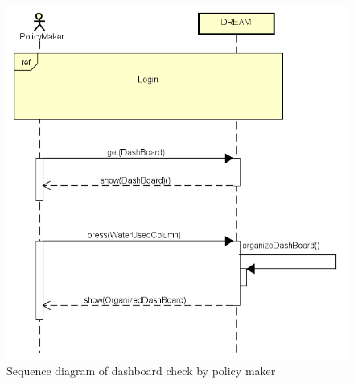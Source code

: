 \bigskip
\begin{figure}[H]
    \centering
    \includegraphics[scale=0.7]{Images/seeDashBoard.png}
    \caption{Sequence diagram of dashboard check by policy maker}
\end{figure}

